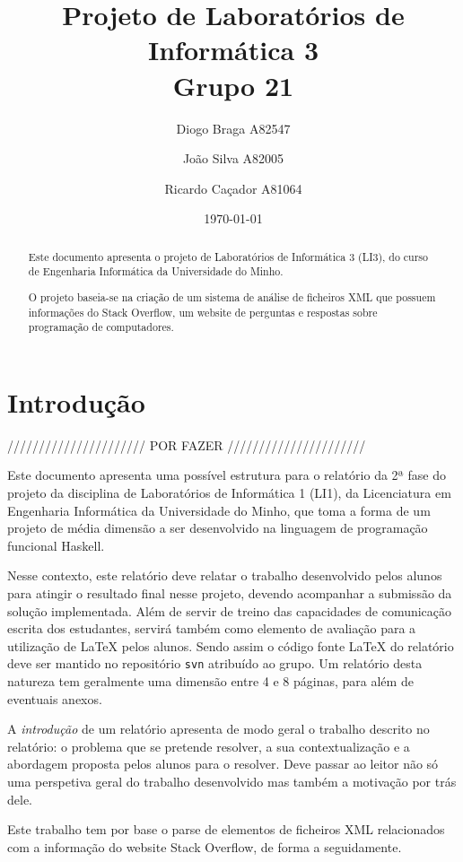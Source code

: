 \documentclass[a4paper]{article}
\title{Projeto de Laboratórios de Informática 3\\Grupo 21}
\author{Diogo Braga A82547 \and João Silva A82005 \and Ricardo Caçador A81064}
\date{\today}
\begin{document}
\maketitle

\begin{abstract}
  Este documento apresenta o projeto de Laboratórios de Informática
  3 (LI3), do curso de Engenharia Informática da Universidade
  do Minho.

  O projeto baseia-se na criação de um sistema de análise de ficheiros 
  XML que possuem informações do Stack Overflow, um website de perguntas
  e respostas sobre programação de computadores.

\end{abstract}

\tableofcontents
\listoffigures

\section{Introdução}
\label{sec:intro}

////////////////////// POR FAZER //////////////////////

Este documento apresenta uma possível estrutura para o relatório da 2ª
fase do projeto da disciplina de Laboratórios de Informática 1 (LI1),
da Licenciatura em Engenharia Informática da Universidade do Minho,
que toma a forma de um projeto de média dimensão a ser desenvolvido na
linguagem de programação funcional Haskell.

Nesse contexto, este relatório deve relatar o trabalho desenvolvido
pelos alunos para atingir o resultado final nesse projeto, devendo
acompanhar a submissão da solução implementada. Além de servir de
treino das capacidades de comunicação escrita dos estudantes, servirá
também como elemento de avaliação para a utilização de \LaTeX{} pelos
alunos. Sendo assim o código fonte \LaTeX{} do relatório deve ser
mantido no repositório \texttt{svn} atribuído ao grupo. Um relatório desta
natureza tem geralmente uma dimensão entre 4 e 8 páginas, para além de
eventuais anexos.

A \emph{introdução} de um relatório apresenta de modo geral o trabalho
descrito no relatório: o problema que se pretende resolver, a sua
contextualização e a abordagem proposta pelos alunos para o
resolver. Deve passar ao leitor não só uma perspetiva geral do
trabalho desenvolvido mas também a motivação por trás dele.

Este trabalho tem por base o parse de elementos de ficheiros XML
relacionados com a informação do website Stack Overflow, de forma
a seguidamente.
\end{document}
